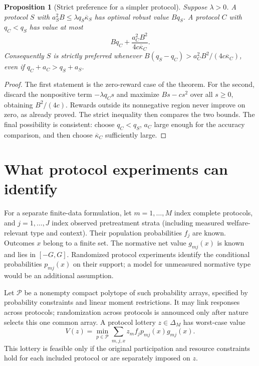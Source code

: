 \documentclass[11pt]{article}
\newtheorem{proposition}[theorem]{Proposition}
\theoremstyle{remark}\newtheorem{remark}[theorem]{Remark}
\begin{document}
\begin{proposition}[Strict preference for a simpler protocol]
Suppose $\lambda>0$. A protocol $S$ with $a_S^2B\le\lambda q_S\overline\kappa_S$ has optimal robust value $Bq_S$. A protocol $C$ with $q_C<q_S$ has value at most
\[
 Bq_C+\frac{a_C^2B^2}{4c\overline\kappa_C}.
\]
Consequently $S$ is strictly preferred whenever
$B(q_S-q_C)>a_C^2B^2/(4c\overline\kappa_C)$, even if $q_C+a_C>q_S+a_S$.
\end{proposition}
\begin{proof}
The first statement is the zero-reward case of the theorem. For the second, discard the nonpositive term $-\lambda q_Cs$ and maximize $Bs-cs^2$ over all $s\ge0$, obtaining $B^2/(4c)$. Rewards outside its nonnegative region never improve on zero, as already proved. The strict inequality then compares the two bounds. The final possibility is consistent: choose $q_C<q_S$, $a_C$ large enough for the accuracy comparison, and then choose $\overline\kappa_C$ sufficiently large.
\end{proof}

\section*{What protocol experiments can identify}
For a separate finite-data formulation, let $m=1,\ldots,M$ index complete protocols, and $j=1,\ldots,J$ index observed pretreatment strata (including measured welfare-relevant type and context). Their population probabilities $f_j$ are known. Outcomes $x$ belong to a finite set. The normative net value $g_{mj}(x)$ is known and lies in $[-G,G]$. Randomized protocol experiments identify the conditional probabilities $p_{mj}(x)$ on their support; a model for unmeasured normative type would be an additional assumption.

Let $\mathcal P$ be a nonempty compact polytope of such probability arrays, specified by probability constraints and linear moment restrictions. It may link responses across protocols; randomization across protocols is announced only after nature selects this one common array. A protocol lottery $z\in\Delta_M$ has worst-case value
\[
 V(z)=\min_{p\in\mathcal P}\sum_{m,j,x}z_m f_jp_{mj}(x)g_{mj}(x).
\]
This lottery is feasible only if the original participation and resource constraints hold for each included protocol or are separately imposed on $z$.
\end{document}
